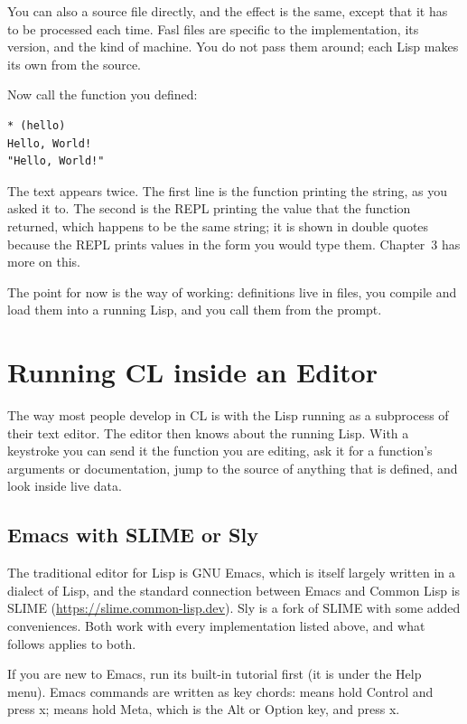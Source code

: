 You can also  a source file directly, and the effect is the
same, except that it has to be processed each time. Fasl files are
specific to the implementation, its version, and the kind of machine.
You do not pass them around; each Lisp makes its own from the source.

Now call the function you defined:

\begin{verbatim}
* (hello)
Hello, World!
"Hello, World!"
\end{verbatim}

The text appears twice. The first line is the function printing the
string, as you asked it to. The second is the REPL printing the value
that the function returned, which happens to be the same string; it
is shown in double quotes because the REPL prints values in the form
you would type them. Chapter~3 has more on this.

The point for now is the way of working: definitions live in files,
you compile and load them into a running Lisp, and you call them from
the prompt.

\section{Running CL inside an Editor}

The way most people develop in CL is with the Lisp running as a
subprocess of their text editor. The editor then knows about the
running Lisp. With a keystroke you can send it the function you are
editing, ask it for a function's arguments or documentation, jump to
the source of anything that is defined, and look inside live data.

\subsection{Emacs with SLIME or Sly}

The traditional editor for Lisp is GNU Emacs, which is itself largely
written in a dialect of Lisp, and the standard connection between
Emacs and Common Lisp is SLIME (\url{https://slime.common-lisp.dev}).
Sly is a fork of SLIME with some added conveniences. Both work with
every implementation listed above, and what follows applies to both.

If you are new to Emacs, run its built-in tutorial first (it is under
the Help menu). Emacs commands are written as key chords: 
means hold Control and press x;  means hold Meta, which is
the Alt or Option key, and press x.

